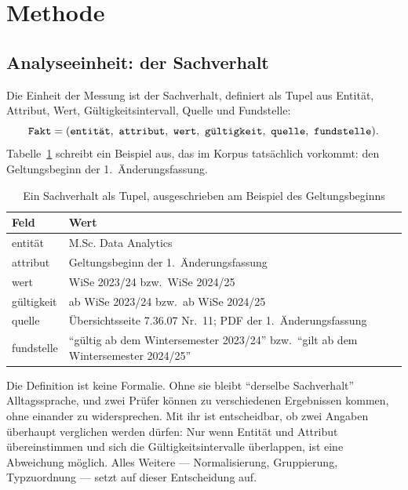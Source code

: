 
\section{Methode}
\label{sec:methode}

\subsection{Analyseeinheit: der Sachverhalt}

Die Einheit der Messung ist der Sachverhalt, definiert als Tupel aus Entität, Attribut, Wert,
Gültigkeitsintervall, Quelle und Fundstelle:
\begin{equation}
  \fakt{Fakt} = (\fakt{entität},\ \fakt{attribut},\ \fakt{wert},\ \fakt{gültigkeit},\
  \fakt{quelle},\ \fakt{fundstelle}).
\end{equation}
Tabelle~\ref{tab:fakt} schreibt ein Beispiel aus, das im Korpus tatsächlich vorkommt: den
Geltungsbeginn der 1.~Änderungsfassung.

\begin{table}[ht]
  \centering
  \caption{Ein Sachverhalt als Tupel, ausgeschrieben am Beispiel des Geltungsbeginns}
  \label{tab:fakt}
  \small
  \begin{tabular}{@{}>{\raggedright\arraybackslash}p{}>{\raggedright\arraybackslash}p{}@{}}
    \toprule
    Feld & Wert \\
    \midrule
    entität & M.Sc. Data Analytics \\
    attribut & Geltungsbeginn der 1.~Änderungsfassung \\
    wert & WiSe 2023/24 bzw.\ WiSe 2024/25 \\
    gültigkeit & ab WiSe 2023/24 bzw.\ ab WiSe 2024/25 \\
    quelle & Übersichtsseite 7.36.07 Nr.~11; PDF der 1.~Änderungsfassung \\
    fundstelle & \enquote{gültig ab dem Wintersemester 2023/24} bzw.\
      \enquote{gilt ab dem Wintersemester 2024/25} \\
    \bottomrule
  \end{tabular}
\end{table}

Die Definition ist keine Formalie. Ohne sie bleibt \enquote{derselbe Sachverhalt}
Alltagssprache, und zwei Prüfer können zu verschiedenen Ergebnissen kommen, ohne einander zu
widersprechen. Mit ihr ist entscheidbar, ob zwei Angaben überhaupt verglichen werden dürfen:
Nur wenn Entität und Attribut übereinstimmen und sich die Gültigkeitsintervalle überlappen,
ist eine Abweichung möglich. Alles Weitere --- Normalisierung, Gruppierung, Typzuordnung ---
setzt auf dieser Entscheidung auf.

